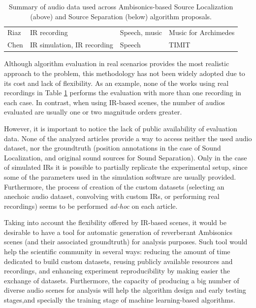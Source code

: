 \begin{table}[htpb]
\begin{tabular}{ p{2cm} p{2.8cm} p{2.5cm} p{2.3cm} }
    Riaz \cite{Riaz2015}
    & IR recording
    & Speech, music
    & Music for Archimedes \\
    
    Chen \cite{Chen2015}
    & IR simulation, IR recording
    & Speech
    & TIMIT \\

    \bottomrule
    \end{tabular}
    \caption{Summary of audio data used across Ambisonics-based Source Localization (above) and Source Separation (below)  algorithm proposals. }
    \label{table:evaluationdata}
\end{table}



Although algorithm evaluation in real scenarios provides the most realistic approach to the problem, this methodology has not been widely adopted due to its cost and lack of flexibility. As an example, none of the works using real recordings in Table \ref{table:evaluationdata} performs the evaluation with more than one  recording in each case. In contrast, when using IR-based  scenes, the number of audios evaluated are usually one or two magnitude orders greater. 

However, it is important to notice the lack of public availability of evaluation data. None of the analyzed articles provide a way to access neither the used audio dataset, nor the groundtruth (position annotations in the case of Sound Localization, and original sound sources for Sound Separation). Only in the case of simulated IRs it is possible to partially replicate the experimental setup, since some of the parameters used in the simulation software are usually provided. Furthermore, the process of creation of the custom datasets (selecting an anechoic audio dataset, convolving with custom IRs, or performing real recordings) seems to be performed \textit{ad-hoc} on each article. 

Taking into account the flexibility offered by IR-based scenes, it would be desirable to have a tool for automatic generation of reverberant Ambisonics scenes (and their associated groundtruth) for analysis purposes. Such tool would help the scientific community in several ways: reducing the amount of time dedicated to build custom datasets, reusing publicly available resources and recordings, and enhancing experiment reproducibility by making easier the exchange of datasets. Furthermore, the capacity of producing a big number of diverse audio scenes for analysis will help the algorithm design and early testing stages,and specially the training stage of machine learning-based algorithms. 


